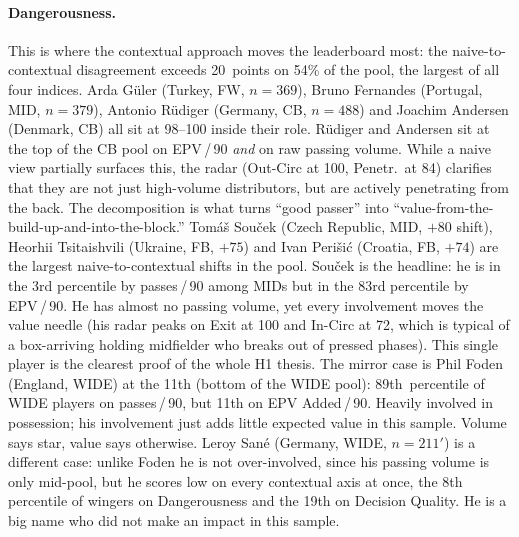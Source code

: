 \documentclass[12pt,a4paper]{article}
\begin{document}
\paragraph{Dangerousness.}
This is where the contextual approach moves the leaderboard most: the naive-to-contextual disagreement exceeds 20~points on 54\% of the pool, the largest of all four indices.
Arda G\"{u}ler (Turkey, FW, $n=369$), Bruno Fernandes (Portugal, MID, $n=379$), Antonio R\"{u}diger (Germany, CB, $n=488$) and Joachim Andersen (Denmark, CB) all sit at 98--100 inside their role.
R\"{u}diger and Andersen sit at the top of the CB pool on EPV\,/\,90 \emph{and} on raw passing volume. While a naive view partially surfaces this, the radar (Out-Circ at 100, Penetr.\ at 84) clarifies that they are not just high-volume distributors, but are actively penetrating from the back.
The decomposition is what turns ``good passer'' into ``value-from-the-build-up-and-into-the-block.''
Tom\'{a}\v{s} Sou\v{c}ek (Czech Republic, MID, $+80$ shift), Heorhii Tsitaishvili (Ukraine, FB, $+75$) and Ivan Peri\v{s}i\'{c} (Croatia, FB, $+74$) are the largest naive-to-contextual shifts in the pool.
Sou\v{c}ek is the headline: he is in the 3rd percentile by passes\,/\,90 among MIDs but in the 83rd percentile by EPV\,/\,90. He has almost no passing volume, yet every involvement moves the value needle (his radar peaks on Exit at 100 and In-Circ at 72, which is typical of a box-arriving holding midfielder who breaks out of pressed phases). This single player is the clearest proof of the whole H1 thesis.
The mirror case is Phil Foden (England, WIDE) at the 11th (bottom of the WIDE pool): 89th~percentile of WIDE players on passes\,/\,90, but 11th on EPV Added\,/\,90.
Heavily involved in possession; his involvement just adds little expected value in this sample. Volume says star, value says otherwise.
Leroy San\'{e} (Germany, WIDE, $n=211'$) is a different case: unlike Foden he is not over-involved, since his passing volume is only mid-pool, but he scores low on every contextual axis at once, the 8th percentile of wingers on Dangerousness and the 19th on Decision Quality. He is a big name who did not make an impact in this sample.
\end{document}
